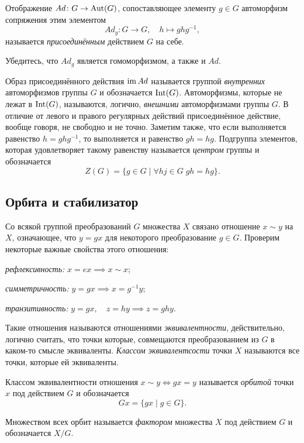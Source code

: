 \begin{example}
    Отображение $Ad \colon G \to \operatorname{Aut}(G)$, сопоставляющее элементу $g\in G$ автоморфизм сопряжения этим элементом \[Ad_g \colon G \to G, \quad h \mapsto ghg^{-1},\] называется \emph{присоединённым} действием $G$ на себе.

    \begin{practice}
        Убедитесь, что $Ad_g$ является гомоморфизмом, а также и $Ad$.
    \end{practice}

    Образ присоединённого действия $\operatorname{im} Ad$ называется группой \emph{внутренних} автоморфизмов группы $G$ и обозначается $\operatorname{Int}(G)$. Автоморфизмы, которые не лежат в $\operatorname{Int}(G)$, называются, логично, \emph{внешними} автоморфизмами группы $G$. В отличие от левого и правого регулярных действий присоединённое действие, вообще говоря, не свободно и не точно. Заметим также, что если выполняется равенство $h = ghg^{-1}$, то выполняется и равенство $gh = hg$. Подгруппа элементов, которая удовлетворяет такому равенству называется \emph{центром} группы и обозначается \[Z(G) = \{g \in G \mid \forall hj \in G\; gh=hg\}.\]
\end{example}

\subsection{Орбита и стабилизатор}
Со всякой группой преобразований $G$ множества $X$ связано отношение $x \sim y$ на $X$, означающее, что $y = gx$ для некоторого преобразование $g \in G$. Проверим некоторые важные свойства этого отношения: \begin{conditions} \item \emph{рефлексивность:} $x = ex \implies x \sim x$;
    \item \emph{симметричность:} $y = gx \implies x = g^{-1}y$;
    \item \emph{транзитивность:} $y = gx,\quad z = hy \implies z = ghy$.
\end{conditions}

Такие отношения называются отношениями \emph{эквивалентности}, действительно, логично считать, что точки которые, совмещаются преобразованием из $G$ в каком-то смысле эквиваленты. \emph{Классом эквивалентсости} точки $X$ называются все точки, которые ей эквиваленты. 
\begin{definition}[Орбита]
    Классом эквивалентности отношения $x \sim y \iff gx = y$ называется \emph{орбитой} точки $x$ под действием $G$ и обозначается 
    \[Gx = \{gx \mid g \in G\}.\]

    Множеством всех орбит называется \emph{фактором} множества $X$ под действием $G$ и обозначается $X/G$.
\end{definition}

